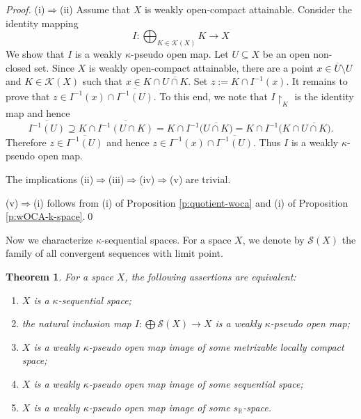 \documentclass[preprint,11pt]{elsarticle}
\newtheorem{theorem}{Theorem}[section]
\numberwithin{equation}{section}
\numberwithin{theorem}{section}
\newcommand{\IR}{\mathbb{R}}
\newcommand{\KK}{\mathcal{K}}
\newcommand{\Ra}{\Rightarrow}
\newcommand{\SM}{{\setminus}}
\begin{document}
\begin{proof}
(i)$\Ra$(ii) Assume that $X$ is weakly open-compact  attainable. Consider the identity mapping
\[
I:\bigoplus_{K\in \KK(X)} K \to X
\]
We show that $I$ is a weakly  $\kappa$-pseudo open map. Let $U\subseteq X$ be an open non-closed set.  Since $X$ is weakly open-compact  attainable, there are a point $x\in \overline{U}\SM U$ and  $K\in\KK(X)$ such that $x\in K\cap \overline{U\cap K}$. Set $z:=K\cap I^{-1}(x)$. It remains to prove that $z\in I^{-1}(x)\cap \overline{I^{-1}(U)}$. To this end, we note that $I{\restriction}_K$ is the identity map and hence
\[
\overline{I^{-1}(U)}\supseteq K\cap\overline{I^{-1}(U\cap K)}=K\cap I^{-1} \big( \overline{U\cap K}\big)=K\cap I^{-1} \big( K\cap\overline{U\cap K}\big).
\]
Therefore $z\in \overline{I^{-1}(U)}$ and hence $z\in I^{-1}(x)\cap \overline{I^{-1}(U)}$. Thus $I$ is a weakly  $\kappa$-pseudo open map.
\smallskip

The implications (ii)$\Ra$(iii)$\Ra$(iv)$\Ra$(v) are trivial.
\smallskip

(v)$\Ra$(i) follows from (i) of Proposition \ref{p:quotient-woca} and  (i) of Proposition \ref{p:wOCA-k-space}.\qed
\end{proof}

Now we characterize $\kappa$-sequential spaces. For a space $X$, we denote by $\mathcal{S}(X)$ the family of all convergent sequences with limit point.

\begin{theorem} \label{t:character-kappa-seq}
For a space $X$, the following assertions are equivalent:
\begin{enumerate}
\item[{\rm(i)}] $X$ is a $\kappa$-sequential space;
\item[{\rm(ii)}] the natural inclusion map $I: \bigoplus\mathcal{S}(X)\to X$ is a weakly  $\kappa$-pseudo open map;
\item[{\rm(iii)}] $X$ is a weakly  $\kappa$-pseudo open map image of some metrizable locally compact space;
\item[{\rm(iv)}] $X$ is a  weakly  $\kappa$-pseudo open map image of some  sequential space;
\item[{\rm(v)}] $X$ is a  weakly   $\kappa$-pseudo open map image of some $s_\IR$-space.
\end{enumerate}
\end{theorem}
\end{document}
